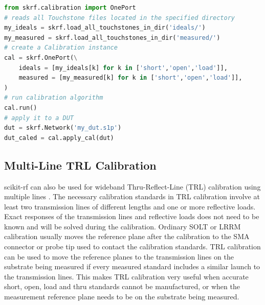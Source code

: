 \documentclass[10pt, letterpaper]{scrartcl}
\newcommand{\skrf}{{s}cikit-rf\xspace}
\begin{document}
\begin{lstlisting}[language=Python]
from skrf.calibration import OnePort
# reads all Touchstone files located in the specified directory
my_ideals = skrf.load_all_touchstones_in_dir('ideals/')
my_measured = skrf.load_all_touchstones_in_dir('measured/')
# create a Calibration instance
cal = skrf.OnePort(\
    ideals = [my_ideals[k] for k in ['short','open','load']],
    measured = [my_measured[k] for k in ['short','open','load']],
)
# run calibration algorithm
cal.run()
# apply it to a DUT
dut = skrf.Network('my_dut.s1p')
dut_caled = cal.apply_cal(dut)
\end{lstlisting}


\subsection{Multi-Line TRL Calibration}
\skrf{} can also be used for wideband Thru-Reflect-Line (TRL) calibration using multiple lines \cite{marks1991}. The necessary calibration standards in TRL calibration involve at least two transmission lines of different lengths and one or more reflective loads. Exact responses of the transmission lines and reflective loads does not need to be known and will be solved during the calibration. Ordinary SOLT or LRRM \cite{davidson1990} calibration usually moves the reference plane after the calibration to the SMA connector or probe tip used to contact the calibration standards. TRL calibration can be used to move the reference planes to the transmission lines on the substrate being measured if every measured standard includes a similar launch to the transmission lines. This makes TRL calibration very useful when accurate short, open, load and thru standards cannot be manufactured, or when the measurement reference plane needs to be on the substrate being measured. 
\end{document}
